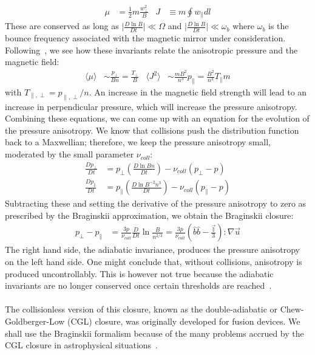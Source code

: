 \begin{align*}
  \mu&=\frac12m\frac{w_\perp^2}{B} &  J&\equiv m\oint w_\parallel dl
\end{align*}
These are conserved as long as $\big|\frac{D\ln B}{Dt}\big|\ll\Omega$ and $\big|\frac{D\ln B}{Dt}\big|\ll\omega_b$ where $\omega_b$ is the bounce frequency associated with the magnetic mirror under consideration. Following~\citet{KunzBraginskii}, we see how these invariants relate the anisotropic pressure and the magnetic field:
\begin{align}
  \langle\mu\rangle&\sim\frac{p_\perp}{Bn}=\frac{T_\perp}{B} &  \langle J^2\rangle&\sim\frac{mB^2}{n^3}p_\parallel=\frac{B^2}{n^2}T_\parallel m\label{eq:javg}
\end{align}
with $T_{\parallel,\perp}=p_{\parallel,\perp}/n$. An increase in the magnetic field strength will lead to an increase in perpendicular pressure, which will increase the pressure anisotropy. Combining these equations, we can come up with an equation for the evolution of the pressure anisotropy. We know that collisions push the distribution function back to a Maxwellian; therefore, we keep the pressure anisotropy small, moderated by the small parameter $\nu_{coll}$:
\begin{align*}
  \frac{Dp_\perp}{Dt}&=p_\perp\left(\frac{D\ln Bn}{Dt}\right)-\nu_{coll}(p_\perp-p)\\
  \frac{Dp_\parallel}{Dt}&=p_\parallel\left(\frac{D\ln B^{-2}n^3}{Dt}\right)-\nu_{coll}(p_\parallel-p)
\end{align*}
Subtracting these and setting the derivative of the pressure anisotropy to zero as prescribed by the Braginskii approximation, we obtain the Braginskii closure:
\begin{align}
  p_\perp-p_\parallel&=\frac{3p}{\nu_{coll}}\frac{D}{Dt}\ln\frac{B}{n^{2/3}}=\frac{3p}{\nu_{coll}}\left(\hat b\hat b-\frac{\vec{\mathbb{I}}}{3}\right):\nabla\vec u \label{eq:bragclos}
\end{align}
The right hand side, the adiabatic invariance, produces the pressure anisotropy on the left hand side. One might conclude that, without collisions, anisotropy is produced uncontrollably. This is however not true because the adiabatic invariants are no longer conserved once certain thresholds are reached~\cite{Sharma2006}. \\
\\
The collisionless version of this closure, known as the double-adiabatic or Chew-Goldberger-Low (CGL) closure, was originally developed for fusion devices. We shall use the Braginskii formalism because of the many problems accrued by the CGL closure in astrophysical situations~\cite{Sharma2006}.\\
